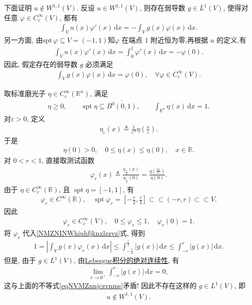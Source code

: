 \documentclass[../../main.tex]{subfiles}
\begin{document}
\begin{remark}
下面证明 $u\notin W^{1,1}(V)$.
反设 $u\in W^{1,1}(V)$, 则存在弱导数 $g\in L^1(V)$, 使得对任意 $\varphi\in C_c^\infty(V)$, 都有
\begin{align*}
\int_V u(x)\varphi'(x)\,\mathrm{d}x
=
-\int_V g(x)\varphi(x)\,\mathrm{d}x.
\end{align*}
另一方面, 由$\text{spt}\,\varphi\subseteq V=(-1,1)$知$\varphi$ 在端点 $1$ 附近恒为零,再根据 $u$ 的定义,有
\begin{align*}
\int_V u(x)\varphi'(x)\,\mathrm{d}x
=
\int_0^1\varphi'(x)\,\mathrm{d}x
=
-\varphi(0).
\end{align*}
因此, 假定存在的弱导数 $g$ 必须满足
\begin{align}\label{NMZNINWhiuhfjknxlzzvz}
\int_V g(x)\varphi(x)\,\mathrm{d}x
=
\varphi(0),
\quad
\forall\varphi\in C_c^\infty(V).
\end{align}

取标准磨光子 $\eta\in C_c^\infty(\mathbb{R}^n)$, 满足
\begin{align*}
\eta\geqslant0,\qquad
\operatorname{spt}\eta\subseteq\overline{B^{0}(0,1)},\qquad
\int_{\mathbb{R}^n}\eta(x)\,\mathrm{d}x=1.
\end{align*}
对$\varepsilon>0$, 定义
\begin{align*}
\eta_\varepsilon(x)
\triangleq\frac{1}{\varepsilon^n}
\eta\left(\frac{x}{\varepsilon}\right).
\end{align*}
于是
\begin{align*}
\eta(0)>0,\quad
0\leqslant\eta(x)\leqslant\eta(0),
\quad x\in\mathbb{R}.
\end{align*}
对 $0<r<1$, 直接取测试函数
\begin{align*}
\varphi_r(x)
\triangleq
\frac{\eta_{\frac{r}{2}}(x)}{\eta_{\frac{r}{2}}(0)}
=
\frac{\eta\left(\frac{2x}{r}\right)}{\eta(0)}.
\end{align*}
由于 $\eta\in C_c^\infty(\mathbb{R})$, 且
$\operatorname{spt}\eta=[-1,1]$, 有
\begin{align*}
\varphi_r\in C^\infty(\mathbb{R}),\quad
\operatorname{spt}\varphi_r
=
\left[-\frac{r}{2},\frac{r}{2}\right]
\subset \subset (-r,r)\subset \subset V.
\end{align*}
因此
\begin{align*}
\varphi_r\in C_c^\infty(V),\quad
0\leqslant\varphi_r\leqslant1,\quad
\varphi_r(0)=1.
\end{align*}
将 $\varphi_r$ 代入\eqref{NMZNINWhiuhfjknxlzzvz}式, 得到
\begin{align}\label{eqNVMZnnjczvnms}
1
=
\left|
\int_V g(x)\varphi_r(x)\,\mathrm{d}x
\right|
\leqslant
\int_{-\frac{r}{2}}^{\frac{r}{2}}|g(x)|\,\mathrm{d}x
\leqslant
\int_{-r}^{r}|g(x)|\,\mathrm{d}x.
\end{align}
但是, 由于 $g\in L^1(V)$, 由\hyperref[Real Analysis-theorem:积分的绝对连续性]{Lebesgue积分的绝对连续性}, 有
\begin{align*}
\lim\limits_{r\to0^+}
\int_{-r}^{r}|g(x)|\,\mathrm{d}x
=0,
\end{align*}
这与上面的不等式\eqref{eqNVMZnnjczvnms}矛盾! 因此不存在这样的 $g\in L^1(V)$, 即
\begin{align*}
u\notin W^{1,1}(V).
\end{align*}


\end{remark}
\end{document}
